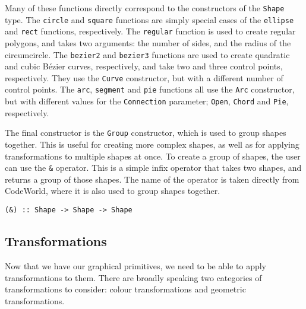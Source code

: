 \documentclass[../main.tex]{subfiles}
\begin{document}
                Many of these functions directly correspond to the constructors of the
                    \texttt{Shape} type.
                The \texttt{circle} and \texttt{square} functions are simply special cases of
                    the \texttt{ellipse} and \texttt{rect} functions, respectively.
                The \texttt{regular} function is used to create regular polygons, and takes two
                    arguments: the number of sides, and the radius of the circumcircle.
                The \texttt{bezier2} and \texttt{bezier3} functions are used to create
                    quadratic and cubic Bézier curves, respectively, and take two and three control
                    points, respectively.
                They use the \texttt{Curve} constructor, but with a different number of control
                    points.
                The \texttt{arc}, \texttt{segment} and \texttt{pie} functions all use the
                    \texttt{Arc} constructor, but with different values for the \texttt{Connection}
                    parameter; \texttt{Open}, \texttt{Chord} and \texttt{Pie}, respectively.

                The final constructor is the \texttt{Group} constructor, which is used to group
                    shapes together.
                This is useful for creating more complex shapes, as well as for applying
                    transformations to multiple shapes at once.
                To create a group of shapes, the user can use the \verb|&| operator.
                This is a simple infix operator that takes two shapes, and returns a group of
                    those shapes.
                The name of the operator is taken directly from CodeWorld, where it is also
                    used to group shapes together.

                \begin{lstlisting}[label={lst:group}, caption={The group (\texttt{\&}) operator.}]
(&) :: Shape -> Shape -> Shape\end{lstlisting}

        \subsection{Transformations}
            Now that we have our graphical primitives, we need to be able to apply
                transformations to them.
            There are broadly speaking two categories of transformations to consider:
                colour transformations and geometric transformations.
\end{document}
